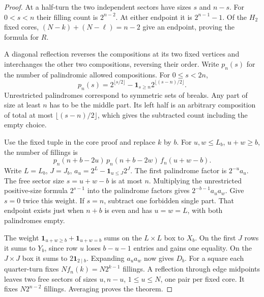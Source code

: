 \documentclass[11pt,letterpaper]{article}
\newcommand{\one}{\mathbf 1}
\begin{document}
\begin{proof}
At a half-turn the two independent sectors have sizes $s$ and $n-s$. For $0<s<n$ their filling count is $2^{n-2}$. At either endpoint it is $2^{n-1}-1$. Of the $H_2$ fixed cores, $(N-k)+(N-\ell)=n-2$ give an endpoint, proving the formula for $R$.

A diagonal reflection reverses the compositions at its two fixed vertices and interchanges the other two compositions, reversing their order. Write $p_n(s)$ for the number of palindromic allowed compositions. For $0\le s<2n$,
\[
 p_n(s)=2^{\lfloor s/2\rfloor}
       -\one_{s\ge n}2^{\lfloor(s-n)/2\rfloor}.
\]
Unrestricted palindromes correspond to symmetric sets of breaks. Any part of size at least $n$ has to be the middle part. Its left half is an arbitrary composition of total at most $\lfloor(s-n)/2\rfloor$, which gives the subtracted count including the empty choice.

Use the fixed tuple in the core proof and replace $k$ by $b$. For $u,w\le L_b$, $u+w\ge b$, the number of fillings is
\[
 p_n(n+b-2u)\,p_n(n+b-2w)\,f_n(u+w-b).
\]
Write $L=L_b$, $J=J_b$, $a_u=2^L-\one_{u\le J}2^J$. The first palindrome factor is $2^{-u}a_u$. The free sector size $s=u+w-b$ is at most $n$. Multiplying the unrestricted positive-size formula $2^{s-1}$ into the palindrome factors gives $2^{-b-1}a_u a_w$. Give $s=0$ twice this weight. If $s=n$, subtract one forbidden single part. That endpoint exists just when $n+b$ is even and has $u=w=L$, with both palindromes empty.

The weight $\one_{u+w\ge b}+\one_{u+w=b}$ sums on the $L\times L$ box to $X_b$. On the first $J$ rows it sums to $Y_b$, since row $u$ loses $b-u-1$ entries and gains one equality. On the $J\times J$ box it sums to $2\one_{2\mid b}$. Expanding $a_u a_w$ now gives $D_b$. For a square each quarter-turn fixes $N f_n(k)=N2^{k-1}$ fillings. A reflection through edge midpoints leaves two free sectors of sizes $u, n-u$, $1\le u\le N$, one pair per fixed core. It fixes $N2^{n-2}$ fillings. Averaging proves the theorem.
\end{proof}

\newpage
\end{document}
